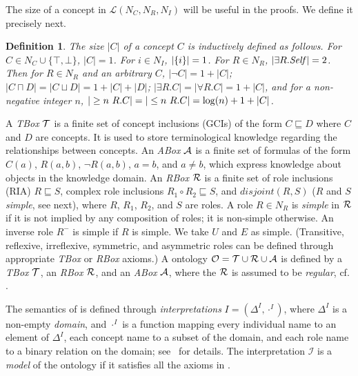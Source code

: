 \documentclass[
]{ceurart}
\newtheorem{definition}{Definition}
\begin{document}
%
The size of a concept in $\mathcal{L}(N_C, N_R, N_I)$ will be useful in the proofs. We define it precisely next.
\begin{definition}
The \emph{size} $|C|$ of a concept $C$ is inductively defined as follows. For $C \in N_C \cup \{\top, \bot\}$, $|C| = 1$. For $i \in N_I$, $|\{i\}| = 1$. For $R \in N_R$, $|\exists R. \mathit{Self}| = 2$. Then for $R \in N_R$ and an arbitrary $C$, $|\lnot C| = 1 + |C|$; $|C \sqcap D| = |C \sqcup D| = 1 + |C| + |D|$; $|\exists R. C| = |\forall R. C| = 1 + |C|$, and for a non-negative integer $n$, $|\geq n~R. C| = |\leq n~R. C| = \log(n) + 1 + |C|$.
\end{definition}




A \emph{TBox} $\mathcal{T}$ is a finite set of concept inclusions (GCIs) of the form $C\sqsubseteq D$ where $C$ and $D$ are concepts. It is used to store terminological knowledge regarding the relationships between concepts. 
An \emph{ABox} $\mathcal{A}$ is a finite set of formulas of the form $C(a)$, $R(a,b)$, $\lnot R(a,b)$, $a = b$, and $a \not = b$, which express knowledge about objects in the knowledge domain.
An \emph{RBox} $\mathcal{R}$ is a finite set of role inclusions (RIA) $R \sqsubseteq S$, complex role inclusions $R_1 \circ R_2 \sqsubseteq S$, and $disjoint(R,S)$ ($R$ and $S$ \emph{simple}, see next), where $R$, $R_1$, $R_2$, and $S$ are roles.
A role $R \in N_R$ is \emph{simple} in $\mathcal{R}$ if it is not implied by any composition of roles; it is non-simple otherwise. An inverse role $R^-$ is simple if $R$ is simple. We take $U$ and $E$ as simple.
%
(Transitive, reflexive, irreflexive, symmetric, and asymmetric roles can be defined through appropriate \emph{TBox} or \emph{RBox} axioms.) %
%
A \SROIQ ontology $\mathcal{O} = \mathcal{T} \cup \mathcal{R} \cup \mathcal{A}$ is defined by a {\em TBox} $\mathcal{T}$, an {\em RBox} $\mathcal{R}$, and an {\em ABox} $\mathcal{A}$, where the $\mathcal{R}$ is assumed to be \emph{regular}, cf. \cite{HorrocksKutzSattlerKR2006}.

The semantics of \SROIQ is defined through \emph{interpretations} $I = (\Delta^I, \cdot^I)$, 
where $\Delta^I$ is a non-empty \emph{domain}, and $\cdot^I$ is a function mapping every
individual name to an element of $\Delta^I$, each concept name to a subset of the domain, and each role name to a binary relation on the domain;  see~\cite{baader_horrocks_lutz_sattler_2017} for details.
%
The interpretation $\mathcal{I}$ is a \emph{model} of the ontology \Ontology if it satisfies all the axioms in \Ontology.
%
\end{document}
